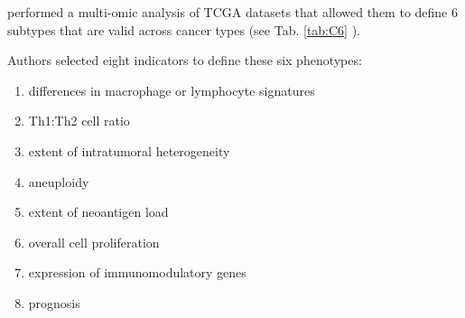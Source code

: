 \documentclass[12pt,]{book}
\providecommand{\tightlist}{%
  \setlength{\itemsep}{0pt}\setlength{\parskip}{0pt}}
\theoremstyle{definition}
\theoremstyle{definition}
\theoremstyle{definition}
\theoremstyle{remark}
\begin{document}
\begin{table}

\caption[Six immunological subtypes of cancer]{\label{tab:C6}\textbf{Six immunological subtypes of cancer}. General
characteristic of subtypes generated by \citet{Thorsson2018} as
described in the original publication.}
\centering
{}
\end{table}

\citet{Thorsson2018} performed a multi-omic analysis of TCGA datasets
that allowed them to define 6 subtypes that are valid across cancer
types (see Tab. \ref{tab:C6} ).





Authors selected eight indicators to define these six phenotypes:

\begin{enumerate}
\def\labelenumi{\arabic{enumi}.}
\tightlist
\item
  differences in macrophage or lymphocyte signatures
\item
  Th1:Th2 cell ratio
\item
  extent of intratumoral heterogeneity
\item
  aneuploidy
\item
  extent of neoantigen load
\item
  overall cell proliferation
\item
  expression of immunomodulatory genes
\item
  prognosis
\end{enumerate}
\end{document}
